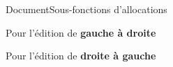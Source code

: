 \begin{frame}{Document}{Sous-fonctions d'allocations}
  
  \begin{minipage}{0.45\textwidth}
    \begin{center}
      
    \end{center}
  \end{minipage}
  \hfill
  \begin{minipage}{0.45\textwidth}
    \begin{center}
      
    \end{center}
  \end{minipage}

  \vspace{0.15cm}

  \begin{minipage}{0.45\textwidth}
    Pour l'édition de \textbf{gauche à droite}
  \end{minipage}
  \hfill
  \begin{minipage}{0.45\textwidth}
    Pour l'édition de \textbf{droite à gauche}
  \end{minipage}
  

\end{frame}
